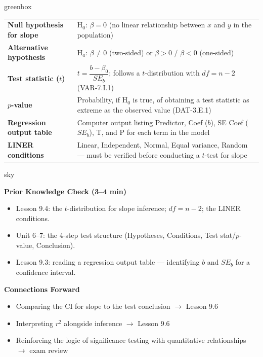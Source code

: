 \documentclass[10pt]{article}
\begin{document}
\begin{skillbox}{greenbox}
\renewcommand{\arraystretch}{1.3}
\begin{tabularx}{\linewidth}{lX}
    \textbf{Null hypothesis for slope} &
        H$_0$: $\beta = 0$ (no linear relationship between $x$ and $y$ in the population) \\
    \textbf{Alternative hypothesis} &
        H$_a$: $\beta \ne 0$ (two-sided) or $\beta > 0$ / $\beta < 0$ (one-sided) \\
    \textbf{Test statistic ($t$)} &
        $t = \dfrac{b - \beta_0}{SE_b}$; follows a $t$-distribution with $df = n - 2$
        (VAR-7.I.1) \\
    \textbf{$p$-value} &
        Probability, if H$_0$ is true, of obtaining a test statistic as extreme as the
        observed value (DAT-3.E.1) \\
    \textbf{Regression output table} &
        Computer output listing Predictor, Coef ($b$), SE Coef ($SE_b$), T, and P for
        each term in the model \\
    \textbf{LINER conditions} &
        Linear, Independent, Normal, Equal variance, Random --- must be verified
        before conducting a $t$-test for slope \\
\end{tabularx}
\end{skillbox}

\begin{skillbox}{sky}
\begin{minipage}[t]{0.48\linewidth}
    \textbf{Prior Knowledge Check (3--4 min)}
    \begin{itemize}
        \item Lesson 9.4: the $t$-distribution for slope inference; $df = n - 2$;
              the LINER conditions.
        \item Unit 6--7: the 4-step test structure (Hypotheses, Conditions, Test
              stat/$p$-value, Conclusion).
        \item Lesson 9.3: reading a regression output table --- identifying $b$ and
              $SE_b$ for a confidence interval.
    \end{itemize}
\end{minipage}
\hfill
\begin{minipage}[t]{0.48\linewidth}
    \textbf{Connections Forward}
    \begin{itemize}
        \item Comparing the CI for slope to the test conclusion $\to$ Lesson 9.6
        \item Interpreting $r^2$ alongside inference $\to$ Lesson 9.6
        \item Reinforcing the logic of significance testing with quantitative
              relationships $\to$ exam review
    \end{itemize}
\end{minipage}
\end{skillbox}
\end{document}
